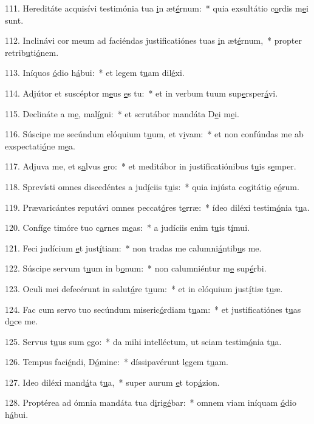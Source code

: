 111. Hereditáte acquisívi testimónia tua \uline{i}n æt\uline{é}rnum:~* quia exsultátio c\uline{o}rdis m\uline{e}i sunt.\par 
112. Inclinávi cor meum ad faciéndas justificatiónes tuas \uline{i}n æt\uline{é}rnum,~* propter retrib\uline{u}ti\uline{ó}nem.\par 
113. Iníquos \uline{ó}dio h\uline{á}bui:~* et legem t\uline{u}am dil\uline{é}xi.\par 
114. Adjútor et suscéptor m\uline{e}us \uline{e}s tu:~* et in verbum tuum sup\uline{e}rsper\uline{á}vi.\par 
115. Declináte a m\uline{e}, mal\uline{í}gni:~* et scrutábor mandáta D\uline{e}i m\uline{e}i.\par 
116. Súscipe me secúndum elóquium t\uline{u}um, et v\uline{i}vam:~* et non confúndas me ab exspectati\uline{ó}ne m\uline{e}a.\par 
117. Adjuva me, et s\uline{a}lvus \uline{e}ro:~* et meditábor in justificatiónibus t\uline{u}is s\uline{e}mper.\par 
118. Sprevísti omnes discedéntes a jud\uline{í}ciis t\uline{u}is:~* quia injústa cogitáti\uline{o} e\uline{ó}rum.\par 
119. Prævaricántes reputávi omnes peccat\uline{ó}res t\uline{e}rræ:~* ídeo diléxi testim\uline{ó}nia t\uline{u}a.\par 
120. Confíge timóre tuo c\uline{a}rnes m\uline{e}as:~* a judíciis enim t\uline{u}is t\uline{í}mui.\par 
121. Feci judícium \uline{e}t just\uline{í}tiam:~* non tradas me calumni\uline{á}ntib\uline{u}s me.\par 
122. Súscipe servum t\uline{u}um in b\uline{o}num:~* non calumniéntur m\uline{e} sup\uline{é}rbi.\par 
123. Oculi mei defecérunt in salut\uline{á}re t\uline{u}um:~* et in elóquium just\uline{í}tiæ t\uline{u}æ.\par 
124. Fac cum servo tuo secúndum miseric\uline{ó}rdiam t\uline{u}am:~* et justificatiónes t\uline{u}as d\uline{o}ce me.\par 
125. Servus t\uline{u}us sum \uline{e}go:~* da mihi intelléctum, ut sciam testim\uline{ó}nia t\uline{u}a.\par 
126. Tempus faci\uline{é}ndi, D\uline{ó}mine:~* díssipavérunt l\uline{e}gem t\uline{u}am.\par 
127. Ideo diléxi mand\uline{á}ta t\uline{u}a,~* super aurum \uline{e}t top\uline{á}zion.\par 
128. Proptérea ad ómnia mandáta tua d\uline{i}rig\uline{é}bar:~* omnem viam iníquam \uline{ó}dio h\uline{á}bui.\par 
